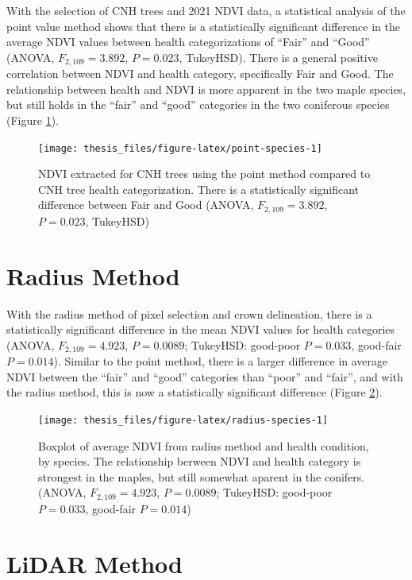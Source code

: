 \documentclass[12pt,twoside]{reedthesis}
\begin{document}
With the selection of CNH trees and 2021 NDVI data, a statistical analysis of the point value method shows that there is a statistically significant difference in the average NDVI values between health categorizations of ``Fair'' and ``Good'' (ANOVA, \(F_{2, 109} = 3.892\), \(P = 0.023\), TukeyHSD). There is a general positive correlation between NDVI and health category, specifically Fair and Good. The relationship between health and NDVI is more apparent in the two maple species, but still holds in the ``fair'' and ``good'' categories in the two coniferous species (Figure \ref{fig:point-species}).
\begin{figure}
\texttt{[image: thesis\_files/figure-latex/point-species-1]} \caption[Point Method NDVI and Health Rating, by Species]{NDVI extracted for CNH trees using the point method compared to CNH tree health categorization. There is a statistically significant difference between Fair and Good (ANOVA, $F_{2, 109} = 3.892$, $P = 0.023$, TukeyHSD)}\label{fig:point-species}
\end{figure}
\hypertarget{radius-method-1}{%
\section{Radius Method}\label{radius-method-1}}

With the radius method of pixel selection and crown delineation, there is a statistically significant difference in the mean NDVI values for health categories (ANOVA, \(F_{2,109}=4.923\), \(P = 0.0089\); TukeyHSD: good-poor \(P = 0.033\), good-fair \(P = 0.014\)). Similar to the point method, there is a larger difference in average NDVI between the ``fair'' and ``good'' categories than ``poor'' and ``fair'', and with the radius method, this is now a statistically significant difference (Figure \ref{fig:radius-species}).
\begin{figure}
\texttt{[image: thesis\_files/figure-latex/radius-species-1]} \caption[Radius method mean NDVI and health condition by species]{Boxplot of average NDVI from radius method and health condition, by species. The relationship berween NDVI and health category is strongest in the maples, but still somewhat aparent in the conifers. (ANOVA, $F_{2,109}=4.923$, $P = 0.0089$; TukeyHSD: good-poor $P = 0.033$, good-fair $P = 0.014$)}\label{fig:radius-species}
\end{figure}
\hypertarget{lidar-method-1}{%
\section{LiDAR Method}\label{lidar-method-1}}
\end{document}
